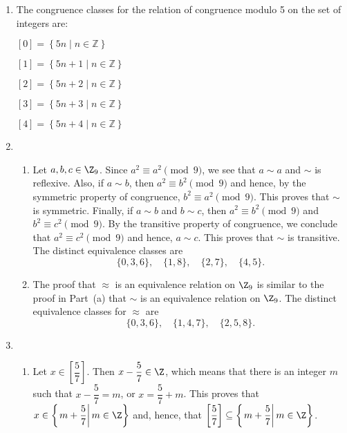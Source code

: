 \begin{enumerate}
\item The congruence classes for the relation of congruence modulo 5 on the set of integers are:

\begin{multicols}{2}$\left[ 0 \right] = \left\{ 5n \mid n \in \mathbb{Z} \right\}$

$\left[ 1 \right] = \left\{ 5n +1 \mid n \in \mathbb{Z} \right\}$

$\left[ 2 \right] = \left\{ 5n + 2 \mid n \in \mathbb{Z} \right\}$

$\left[ 3 \right] = \left\{ 5n + 3 \mid n \in \mathbb{Z} \right\}$

$\left[ 4 \right] = \left\{ 5n + 4 \mid n \in \mathbb{Z} \right\}$
\end{multicols}


\item \begin{enumerate}
\item Let $a, b, c \in \Z_9$.  Since $a^2 \equiv a^2 \pmod 9$, we see that $a \sim a$ and $\sim$ is reflexive.  Also, if $a \sim b$, then $a^2 \equiv b^2 \pmod 9$ and hence, by the symmetric property of congruence, $b^2 \equiv a^2 \pmod 9$.  This proves that $\sim$ is symmetric.  Finally, if $a \sim b$ and $b \sim c$, then 
$a^2 \equiv b^2 \pmod 9$ and $b^2 \equiv c^2 \pmod 9$.  By the transitive property of congruence, we conclude that $a^2 \equiv c^2 \pmod 9$ and hence, $a \sim c$.  This proves that $\sim$ is transitive.  The distinct equivalence classes are
\[
\{ 0, 3, 6 \}, \quad \{ 1, 8 \}, \quad \{2, 7 \}, \quad \{4, 5 \}.
\]
\item The proof that $\approx$ is an equivalence relation on $\Z_9$ is similar to the proof in Part~(a) that $\sim$ is an equivalence relation on $\Z_9$.  The distinct equivalence classes for $\approx$ are
\[
\{ 0, 3, 6 \}, \quad \{ 1, 4, 7 \}, \quad \{2, 5, 8 \}.
\]
\end{enumerate}



\item \begin{enumerate}
\item Let $x \in \left[ \dfrac{5}{7} \right]$.  Then $x - \dfrac{5}{7} \in \Z$, which means that there is an integer $m$ such that $x - \dfrac{5}{7} = m$, or $x = \dfrac{5}{7} + m$.  This proves that \linebreak
$x \in \left\{ \left. m + \dfrac{5}{7} \right| m \in \Z \right\}$ and, hence, that
$\left[ \dfrac{5}{7} \right] \subseteq \left\{ \left. m + \dfrac{5}{7} \right| m \in \Z \right\}$.


\end{enumerate}
\end{enumerate}
